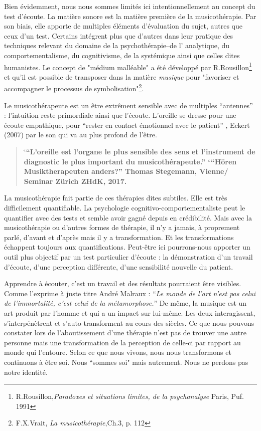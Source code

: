  Bien évidemment, nous nous sommes  limités ici intentionnellement au concept
 du test d'écoute. 
 La matière sonore est la matière première de la  musicothérapie. 
 Par son biais, elle  apporte de multiples éléments d'évaluation du
 sujet, autres que ceux 
 d'un test. 
 Certains  intégrent plus que d'autres dans leur pratique des techniques relevant du domaine de la psychothérapie--de l' analytique, 
  du comportementalisme, du cognitivisme, de la  systémique ainsi que
  celles dites humanistes.  Le concept de "médium malléable" a été
  développé par  R.Rousillon\footnote{R.Rousillon,\textit{Paradoxes et situations limites,  
  		de la psychanalyse} Paris, Puf. 1991} 
  et qu'il est possible de transposer dans la matière \textit{musique} 
  pour "favoriser et accompagner le processus 
  de symbolisation"\footnote{F.X.Vrait, \textit{La musicothérapie},Ch.3, p. 112}.

 Le musicothérapeute est un être extrêment sensible avec de multiples ``antennes'' : l'intuition reste primordiale  ainsi que  
 l'écoute. L'oreille se dresse pour une écoute empathique, pour ``rester en contact émotionnel  
 avec le patient'' , Eckert (2007) par le son qui va au plus profond de
 l'être.

 
\begin{quotation}
	\char`\"{}\textbf{``L'oreille est l'organe le plus sensible des sens 
et l'instrument de diagnostic  le plus important du
musicothérapeute.'' `\"{``Hören Musiktherapeuten anders?'' }Thomas
Stegemann, Vienne/ Seminar Zürich ZHdK, 2017.}
 	
\end{quotation}
La musicothérapie fait partie de ces thérapies dites subtiles. Elle
est très difficilement quantifiable. La
psychologie cognitivo-comportementaliste peut le quantifier avec des tests et semble avoir gagné depuis en crédibilité. Mais avec la musicothérapie ou d'autres formes de thérapie, il n'y a
jamais, à proprement parlé, d'avant et d'après mais il y a transformation.
Et les transformations échappent toujours aux quantifications. Peut-être
ici pourrons-nous apporter un outil plus objectif par un test particulier
d'écoute : la démonstration d'un travail d'écoute, d'une perception
différente, d'une sensibilité nouvelle du patient. 


Apprendre à écouter,
c'est un travail et des résultats pourraient être visibles.
Comme l'exprime à juste titre André Malraux : \enquote{\emph{Le monde de
	l'art n'est pas celui de l'immortalité, c'est celui de la métamorphose.}}
De même, la musique est un art produit par l'homme et qui a un impact
sur lui-même. Les deux interagissent, s'interpénètrent et s'auto-transforment
au cours des siècles.
 Ce que nous pouvons constater lors de l'aboutissement
d'une thérapie n'est pas de trouver une autre personne mais une transformation
de la perception de celle-ci par rapport au monde qui l'entoure. 
Selon
ce que nous vivons, nous nous transformons et continuons à être
soi. Nous ``sommes soi" mais autrement. Nous ne perdons
pas notre identité.

